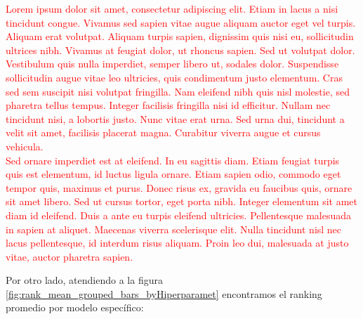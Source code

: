\documentclass[print, color]{ugrTFG}
\begin{document}
\textcolor{red}{
 Lorem ipsum dolor sit amet, consectetur adipiscing elit. Etiam in lacus a nisi tincidunt congue. Vivamus sed sapien vitae augue aliquam auctor eget vel turpis. Aliquam erat volutpat. Aliquam turpis sapien, dignissim quis nisi eu, sollicitudin ultrices nibh. Vivamus at feugiat dolor, ut rhoncus sapien. Sed ut volutpat dolor. Vestibulum quis nulla imperdiet, semper libero ut, sodales dolor. Suspendisse sollicitudin augue vitae leo ultricies, quis condimentum justo elementum. Cras sed sem suscipit nisi volutpat fringilla. Nam eleifend nibh quis nisl molestie, sed pharetra tellus tempus. Integer facilisis fringilla nisi id efficitur. Nullam nec tincidunt nisi, a lobortis justo. Nunc vitae erat urna. Sed urna dui, tincidunt a velit sit amet, facilisis placerat magna. Curabitur viverra augue et cursus vehicula.\\ 
Sed ornare imperdiet est at eleifend. In eu sagittis diam. Etiam feugiat turpis quis est elementum, id luctus ligula ornare. Etiam sapien odio, commodo eget tempor quis, maximus et purus. Donec risus ex, gravida eu faucibus quis, ornare sit amet libero. Sed ut cursus tortor, eget porta nibh. Integer elementum sit amet diam id eleifend. Duis a ante eu turpis eleifend ultricies. Pellentesque malesuada in sapien at aliquet. Maecenas viverra scelerisque elit. Nulla tincidunt nisl nec lacus pellentesque, id interdum risus aliquam. Proin leo dui, malesuada at justo vitae, auctor pharetra sapien.
}\\ \newline


Por otro lado, atendiendo a la figura \ref{fig:rank_mean_grouped_bars_byHiperparamet} encontramos el ranking promedio por modelo específico:
\end{document}
